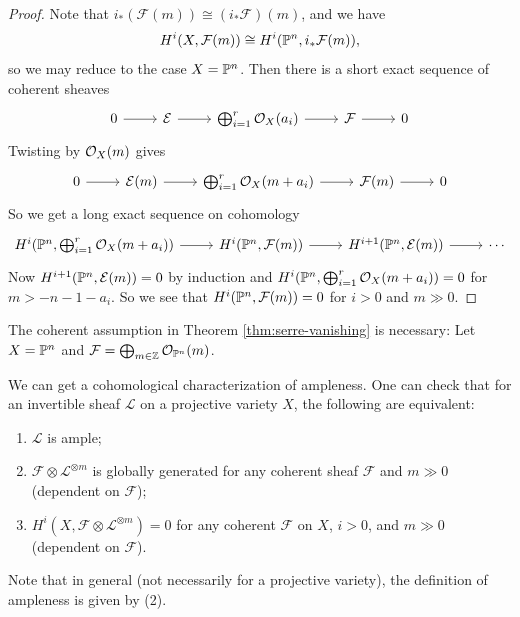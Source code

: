 \begin{proof}
  Note that $i_*(\mathcal{F}(m)) \cong (i_* \mathcal{F})(m)$, and
  we have
  \[
    H^i(X, \mathcal{F}(m))
    \cong H^i(\mathbb{P}^n, i_* \mathcal{F}(m)),
  \]
  so we may reduce to the case
  $X = \mathbb{P}^n$. Then there is a
  short exact sequence of coherent sheaves
  \[
    \begin{tikzcd}
      0 \ar[r] & \mathcal{E} \ar[r] &
      \bigoplus_{i = 1}^r \OO_X(a_i)
      \ar[r] & \mathcal{F} \ar[r] & 0
    \end{tikzcd}
  \]
  Twisting by $\mathcal{O}_X(m)$ gives
  \[
    \begin{tikzcd}
      0 \ar[r] & \mathcal{E}(m) \ar[r] &
      \bigoplus_{i = 1}^r \OO_X(m + a_i)
      \ar[r] & \mathcal{F}(m) \ar[r] & 0
    \end{tikzcd}
  \]
  So we get a long exact sequence
  on cohomology
  \[
    \begin{tikzcd}
      H^i(\PP^n, \bigoplus_{i = 1}^r \OO_X(m + a_i))
      \ar[r] & H^i(\PP^n, \mathcal{F}(m)) \ar[r] &
      H^{i + 1}(\PP^n, \mathcal{E}(m))
      \ar[r] & \cdots
    \end{tikzcd}
  \]
  Now $H^{i + 1}(\mathbb{P}^n, \mathcal{E}(m)) = 0$
  by induction and
  $H^i(\mathbb{P}^n, \bigoplus_{i = 1}^r \mathcal{O}_X(m + a_i)) = 0$
  for $m > -n - 1 - a_i$. So we see that
  $H^i(\mathbb{P}^n, \mathcal{F}(m)) = 0$
  for $i > 0$ and $m \gg 0$.
\end{proof}

\begin{remark}
  The coherent assumption in
  Theorem \ref{thm:serre-vanishing} is
  necessary: Let $X = \mathbb{P}^n$
  and $\mathcal{F} = \bigoplus_{m \in \mathbb{Z}} \mathcal{O}_{\mathbb{P}^n}(m)$.
\end{remark}

\begin{remark}
  We can get a cohomological
  characterization of ampleness. One
  can check that for an invertible sheaf
  $\mathcal{L}$ on a projective
  variety $X$, the following
  are equivalent:
  \begin{enumerate}
    \item $\mathcal{L}$ is ample;
    \item $\mathcal{F} \otimes \mathcal{L}^{\otimes m}$
      is globally generated for any
      coherent sheaf $\mathcal{F}$ and $m \gg 0$ (dependent on $\mathcal{F}$);
    \item $H^i(X, \mathcal{F} \otimes \mathcal{L}^{\otimes m}) = 0$
      for any coherent $\mathcal{F}$ on
      $X$, $i > 0$, and $m \gg 0$
      (dependent on $\mathcal{F}$).
  \end{enumerate}
  Note that in general (not necessarily
  for a projective variety), the
  definition of ampleness is given by (2).
\end{remark}
